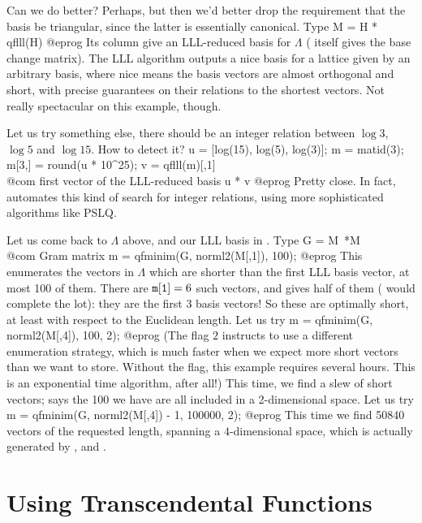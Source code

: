 Can we do better? Perhaps, but then we'd better drop the requirement that
the basis be triangular, since the latter is essentially canonical. Type
\bprog
  M = H * qflll(H)
@eprog
Its column give an LLL-reduced basis for $\Lambda$ ( itself
gives the base change matrix). The LLL algorithm outputs a nice basis for a
lattice given by an arbitrary basis, where nice means the basis vectors are
almost orthogonal and short, with precise guarantees on their relations to
the shortest vectors. Not really spectacular on this example, though.

Let us try something else, there should be an integer relation between
$\log 3$, $\log 5$ and $\log 15$. How to detect it?
\bprog
  u = [log(15), log(5), log(3)];
  m = matid(3); m[3,] = round(u * 10^25);
  v = qflll(m)[,1] \\@com first vector of the LLL-reduced basis
  u * v
@eprog\noindent
Pretty close. In fact,  automates this kind of search for integer
relations, using more sophisticated algorithms like PSLQ.

Let us come back to $\Lambda$ above, and our LLL basis in . Type
\bprog
  G = M~*M  \\@com Gram matrix
  m = qfminim(G, norml2(M[,1]), 100);
@eprog\noindent
This enumerates the vectors in $\Lambda$ which are shorter than the first LLL
basis vector, at most 100 of them. There are ${\tt m[1]} = 6$ such vectors,
and  gives half of them ( would complete the lot): they
are the first 3 basis vectors! So these are optimally short, at least with
respect to the Euclidean length. Let us try
\bprog
  m = qfminim(G, norml2(M[,4]), 100, 2);
@eprog\noindent
(The flag $2$ instructs  to use a different enumeration
strategy, which is much faster when we expect more short vectors than we want
to store. Without the flag, this example requires several hours. This is an
exponential time algorithm, after all!) This time, we find a slew of short
vectors;  says the 100 we have are all included in a
2-dimensional space. Let us try
\bprog
  m = qfminim(G, norml2(M[,4]) - 1, 100000, 2);
@eprog\noindent
This time we find 50840 vectors of the requested length, spanning a
$4$-dimensional space, which is actually generated by ,
  and .

\section{Using Transcendental Functions}

